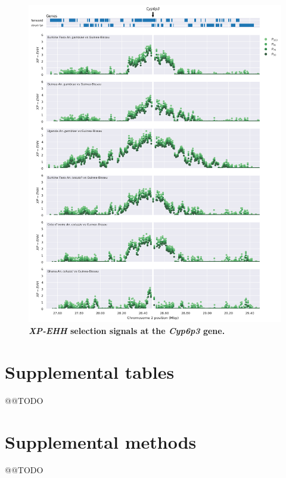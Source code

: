 \documentclass[a4paper,11pt,abstracton,hidelinks]{scrartcl}
\begin{document}
\begin{figure}[t!]
	\begin{center}
		\includegraphics*[width=1.1\linewidth,center]{artwork/locus_cyp6p3_xpehh.png}
	\end{center}
	\caption[\textit{XP-EHH} selection signals at the \textit{Cyp6p3} gene]{
	\textbf{\textit{XP-EHH} selection signals at the \textit{Cyp6p3} gene.} 
	} 
	\label{fig:locus_cyp6p3_xpehh}
\end{figure}


\clearpage

\section*{Supplemental tables}

@@TODO


\clearpage


\section*{Supplemental methods}

@@TODO


\printbibliography
\end{document}
